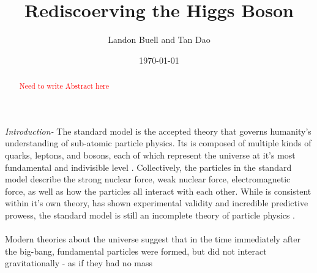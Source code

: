 \documentclass[aps,prl,twocolumn,superscriptaddress,groupedaddress,nofootinbib]{revtex4-2}  %
\begin{document}
\title{Rediscoerving the Higgs Boson}
\author{Landon Buell and Tan Dao} 
\date{\today}

\begin{abstract}

\textcolor{red}{Need to write Abstract here}

\end{abstract}

\maketitle 


\paragraph{}\emph{Introduction-} The standard model is the accepted theory that governs humanity's understanding of sub-atomic particle physics. Its is composed of multiple kinds of quarks, leptons, and bosons, each of which represent the universe at it's most fundamental and indivisible level \cite{Oerter}. Collectively, the particles in the standard model describe the strong nuclear force, weak nuclear force, electromagnetic force, as well as how the particles all interact with each other. While is consistent within it's own theory, has shown experimental validity and incredible predictive prowess, the standard model is still an incomplete theory of particle physics \cite{Englert,Mann}.

\paragraph{}

\paragraph{}Modern theories about the universe suggest that in the time immediately after the big-bang, fundamental particles were formed, but did not interact gravitationally - as if they had no mass \cite{Englert}

\hspace{1cm}

\end{document}

